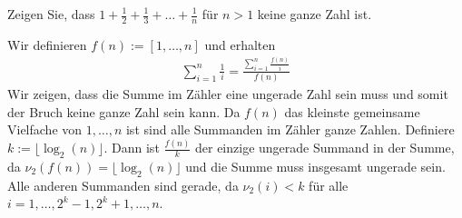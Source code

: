 
\begin{exercise}

Zeigen Sie, dass $1 + \frac{1}{2} + \frac{1}{3} + \dots + \frac{1}{n}$ für $n > 1$
keine ganze Zahl ist.

\end{exercise}


\begin{solution}
Wir definieren $f(n) := [1,\dots,n]$ und erhalten
\begin{align*}
  \sum_{i=1}^n \frac{1}{i} = \frac{\sum_{i=1}^n \frac{f(n)}{i}}{f(n)}
\end{align*}
Wir zeigen, dass die Summe im Zähler eine ungerade Zahl sein muss und somit der
Bruch keine ganze Zahl sein kann. Da $f(n)$ das kleinste gemeinsame Vielfache von
$1,\dots,n$ ist sind alle Summanden im Zähler ganze Zahlen. Definiere $k := \lfloor \log_2(n) \rfloor$.
Dann ist $\frac{f(n)}{k}$ der einzige ungerade Summand in der Summe, da
$\nu_2(f(n)) = \lfloor \log_2(n) \rfloor$ und die Summe
muss insgesamt ungerade sein. Alle anderen Summanden sind gerade, da $\nu_2(i) < k$
für alle $i = 1,\dots,2^k-1,2^k+1,\dots,n$.

\end{solution}

